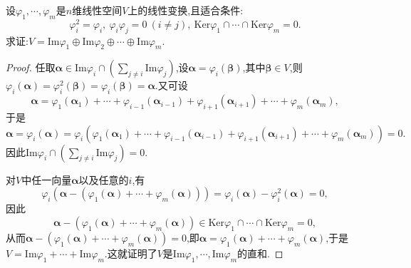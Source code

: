 \documentclass[lang=cn,newtx,10pt,scheme=chinese]{elegantbook}
\begin{document}
\begin{proposition}\label{proposition:由投影变换性质反推直和分解}
设\(\varphi_1,\cdots,\varphi_m\)是\(n\)维线性空间\(V\)上的线性变换,且适合条件:
\[
\varphi_i^2 = \varphi_i,\ \varphi_i\varphi_j = 0\ (i\neq j),\ \text{Ker}\varphi_1\cap\cdots\cap\text{Ker}\varphi_m = 0.
\]
求证:\(V = \text{Im}\varphi_1\oplus\text{Im}\varphi_2\oplus\cdots\oplus\text{Im}\varphi_m\).
\end{proposition}
\begin{proof}
任取\(\boldsymbol{\alpha}\in\text{Im}\varphi_i\cap(\sum_{j\neq i}\text{Im}\varphi_j)\),设\(\boldsymbol{\alpha}=\varphi_i(\boldsymbol{\beta})\),其中\(\boldsymbol{\beta}\in V\),则\(\varphi_i(\boldsymbol{\alpha})=\varphi_i^2(\boldsymbol{\beta})=\varphi_i(\boldsymbol{\beta})=\boldsymbol{\alpha}\).又可设
\[
\boldsymbol{\alpha}=\varphi_1(\boldsymbol{\alpha}_1)+\cdots+\varphi_{i - 1}(\boldsymbol{\alpha}_{i - 1})+\varphi_{i + 1}(\boldsymbol{\alpha}_{i + 1})+\cdots+\varphi_m(\boldsymbol{\alpha}_m),
\]
于是
\[
\boldsymbol{\alpha}=\varphi_i(\boldsymbol{\alpha})=\varphi_i(\varphi_1(\boldsymbol{\alpha}_1)+\cdots+\varphi_{i - 1}(\boldsymbol{\alpha}_{i - 1})+\varphi_{i + 1}(\boldsymbol{\alpha}_{i + 1})+\cdots+\varphi_m(\boldsymbol{\alpha}_m)) = 0.
\]
因此\(\text{Im}\varphi_i\cap(\sum_{j\neq i}\text{Im}\varphi_j)=0\).

对\(V\)中任一向量\(\boldsymbol{\alpha}\)以及任意的\(i\),有
\[
\varphi_i(\boldsymbol{\alpha}-(\varphi_1(\boldsymbol{\alpha})+\cdots+\varphi_m(\boldsymbol{\alpha})))=\varphi_i(\boldsymbol{\alpha})-\varphi_i^2(\boldsymbol{\alpha}) = 0,
\]
因此
\[
\boldsymbol{\alpha}-(\varphi_1(\boldsymbol{\alpha})+\cdots+\varphi_m(\boldsymbol{\alpha}))\in\text{Ker}\varphi_1\cap\cdots\cap\text{Ker}\varphi_m = 0,
\]
从而\(\boldsymbol{\alpha}-(\varphi_1(\boldsymbol{\alpha})+\cdots+\varphi_m(\boldsymbol{\alpha})) = 0\),即\(\boldsymbol{\alpha}=\varphi_1(\boldsymbol{\alpha})+\cdots+\varphi_m(\boldsymbol{\alpha})\),于是\(V=\text{Im}\varphi_1+\cdots+\text{Im}\varphi_m\).这就证明了\(V\)是\(\text{Im}\varphi_1,\cdots,\text{Im}\varphi_m\)的直和.
\end{proof}
\end{document}

